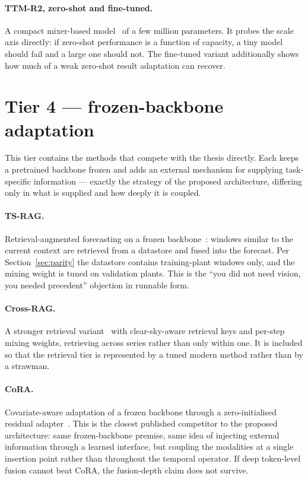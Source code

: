 \paragraph{TTM-R2, zero-shot and fine-tuned.} A compact mixer-based
model~\cite{ttm} of a few million parameters. It probes the scale axis directly: if
zero-shot performance is a function of capacity, a tiny model should fail and a large one
should not. The fine-tuned variant additionally shows how much of a weak zero-shot result
adaptation can recover.

\section{Tier 4 --- frozen-backbone adaptation}
\label{sec:tier4}

This tier contains the methods that compete with the thesis directly. Each keeps a
pretrained backbone frozen and adds an external mechanism for supplying task-specific
information --- exactly the strategy of the proposed architecture, differing only in what is
supplied and how deeply it is coupled.

\paragraph{TS-RAG.} Retrieval-augmented forecasting on a frozen backbone~\cite{tsrag}:
windows similar to the current context are retrieved from a datastore and fused into the
forecast. Per Section~\ref{sec:parity} the datastore contains training-plant windows only,
and the mixing weight is tuned on validation plants. This is the ``you did not need vision,
you needed precedent'' objection in runnable form.

\paragraph{Cross-RAG.} A stronger retrieval variant~\cite{crossrag} with clear-sky-aware
retrieval keys and per-step mixing weights, retrieving across series rather than only within
one. It is included so that the retrieval tier is represented by a tuned modern method
rather than by a strawman.

\paragraph{CoRA.} Covariate-aware adaptation of a frozen backbone through a zero-initialised
residual adapter~\cite{cora}. This is the closest published competitor to the proposed
architecture: same frozen-backbone premise, same idea of injecting external information
through a learned interface, but coupling the modalities at a single insertion point rather
than throughout the temporal operator. If deep token-level fusion cannot beat CoRA, the
fusion-depth claim does not survive.

